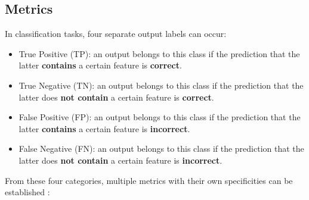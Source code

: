 \subsection{Metrics}
In classification tasks, four separate output labels can occur:
\begin{itemize}
\item True Positive (TP):  an output belongs to this class if the prediction that the latter \textbf{contains} a certain feature is \textbf{correct}.
\item True Negative (TN): an output belongs to this class if the prediction that the latter does \textbf{not contain} a certain feature is \textbf{correct}.
\item False Positive (FP): an output belongs to this class if the prediction that the latter \textbf{contains} a certain feature is \textbf{incorrect}.
\item False Negative (FN): an output belongs to this class if the prediction that the latter does \textbf{not contain} a certain feature is \textbf{incorrect}.
\end{itemize}
From these four categories, multiple metrics with their own specificities can be established \cite{25}:

